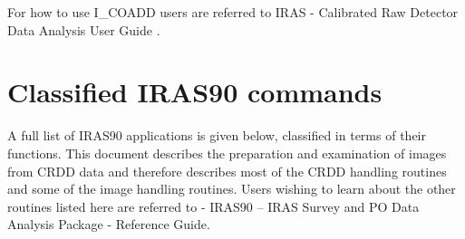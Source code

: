 \documentclass[twoside,11pt]{starlink}
\begin{document}
For how to use I\_COADD users are referred to IRAS - Calibrated Raw Detector
Data Analysis User Guide .

\section{Classified IRAS90 commands
\label{m:otheriras90}}

A full list of {\small IRAS90} applications is given below, classified in terms
of their functions. This document describes the preparation and examination
of images from CRDD data and therefore describes most of the CRDD handling
routines and some of the image handling routines. Users wishing to learn about
the other routines listed here are referred to
 - IRAS90 -- IRAS Survey
and PO Data Analysis Package - Reference Guide.
\end{document}
